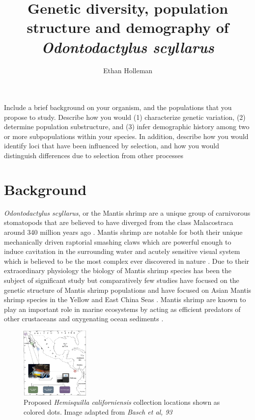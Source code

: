 \documentclass[11pt]{article}
\title{Genetic diversity, population structure and demography of \emph{Odontodactylus scyllarus}}
\date{}
\author{Ethan Holleman}
\begin{document}
\maketitle
\thispagestyle{empty}


Include a brief background on your organism, and the populations that you propose to study. Describe how you would (1) characterize genetic variation, (2) determine population substructure, and (3) infer demographic history among two or more subpopulations within your species. In addition, describe how you would identify loci that have been influenced by selection, and how you would distinguish differences due to selection from other processes

\section{Background}

\emph{Odontodactylus scyllarus}, or the Mantis shrimp are a unique group of carnivorous stomatopods that are believed to have diverged from the class Malacostraca around 340 million years ago \cite{VanDerWal2017}. Mantis shrimp are notable for both their unique mechanically driven raptorial smashing claws which are powerful enough to induce cavitation in the surrounding water \cite{Patek2004, Patek2005} and acutely sensitive visual system which is believed to be the most complex ever discovered in nature \cite{Cronin2014, Milius2012}. Due to their extraordinary physiology the biology of Mantis shrimp species has been the subject of significant study but comparatively few studies have focused on the genetic structure of Mantis shrimp populations and have focused on Asian Mantis shrimp species in the Yellow and East China Seas \cite{Yang2018}. Mantis shrimp are known to play an important role in marine ecosystems by acting as efficient predators of other crustaceans and oxygenating ocean sediments \cite{Antony2010}. 


\begin{figure}
	\begin{center}
		\includegraphics[width=0.30\textwidth]{images/sampling_locations.png}
	\end{center}
	\caption{Proposed \emph{Hemisquilla californiensis} collection locations shown as colored dots. Image adapted from \emph{Basch et al, 93}}
\end{figure}
\end{document}
